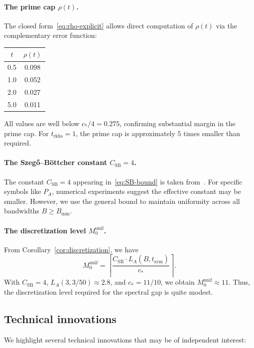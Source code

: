 \documentclass[11pt,a4paper]{article}
\theoremstyle{definition}
\theoremstyle{remark}
\begin{document}
\paragraph{The prime cap $\rho(t)$.}
The closed form~\eqref{eq:rho-explicit} allows direct computation of $\rho(t)$ via the complementary error function:
\begin{center}
\begin{tabular}{@{}cc@{}}
\toprule
$t$ & $\rho(t)$ \\
\midrule
0.5 & 0.098 \\
1.0 & 0.052 \\
2.0 & 0.027 \\
5.0 & 0.011 \\
\bottomrule
\end{tabular}
\end{center}
All values are well below $c_*/4 = 0.275$, confirming substantial margin in the prime cap. For $t_{\mathrm{rkhs}} = 1$, the prime cap is approximately $5$ times smaller than required.

\paragraph{The Szeg\H{o}--B\"ottcher constant $C_{\mathrm{SB}} = 4$.}
The constant $C_{\mathrm{SB}} = 4$ appearing in~\eqref{eq:SB-bound} is taken from~\cite[Theorem~5.11]{BoettcherSilbermann2006}. For specific symbols like $P_A$, numerical experiments suggest the effective constant may be smaller. However, we use the general bound to maintain uniformity across all bandwidths $B \geq B_{\min}$.

\paragraph{The discretization level $M_0^{\mathrm{unif}}$.}
From Corollary~\ref{cor:discretization}, we have
\[
  M_0^{\mathrm{unif}} = \left\lceil \frac{C_{\mathrm{SB}} \cdot L_A(B, t_{\mathrm{sym}})}{c_*} \right\rceil.
\]
With $C_{\mathrm{SB}} = 4$, $L_A(3, 3/50) \approx 2.8$, and $c_* = 11/10$, we obtain $M_0^{\mathrm{unif}} \approx 11$. Thus, the discretization level required for the spectral gap is quite modest.

\subsection{Technical innovations}

We highlight several technical innovations that may be of independent interest:
\end{document}
